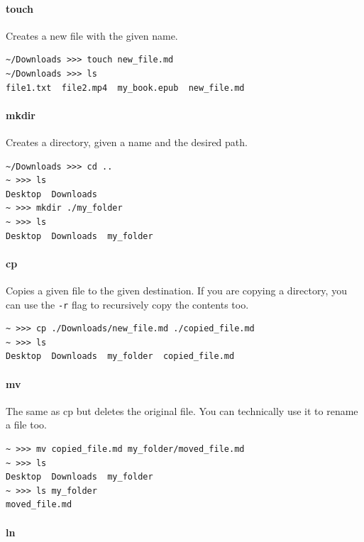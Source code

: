 \hypertarget{touch}{%
\paragraph{touch}\label{touch}}

Creates a new file with the given name.

\begin{verbatim}
~/Downloads >>> touch new_file.md
~/Downloads >>> ls
file1.txt  file2.mp4  my_book.epub  new_file.md
\end{verbatim}

\hypertarget{mkdir}{%
\paragraph{mkdir}\label{mkdir}}

Creates a directory, given a name and the desired path.

\begin{verbatim}
~/Downloads >>> cd ..
~ >>> ls
Desktop  Downloads
~ >>> mkdir ./my_folder
~ >>> ls
Desktop  Downloads  my_folder
\end{verbatim}

\hypertarget{cp}{%
\paragraph{cp}\label{cp}}

Copies a given file to the given destination. If you are copying a directory, you can use the \texttt{-r} flag to recursively copy the contents too.

\begin{verbatim}
~ >>> cp ./Downloads/new_file.md ./copied_file.md
~ >>> ls
Desktop  Downloads  my_folder  copied_file.md
\end{verbatim}

\hypertarget{mv}{%
\paragraph{mv}\label{mv}}

The same as cp but deletes the original file. You can technically use it to rename a file too.

\begin{verbatim}
~ >>> mv copied_file.md my_folder/moved_file.md
~ >>> ls
Desktop  Downloads  my_folder
~ >>> ls my_folder
moved_file.md
\end{verbatim}

\hypertarget{ln}{%
\paragraph{ln}\label{ln}}

